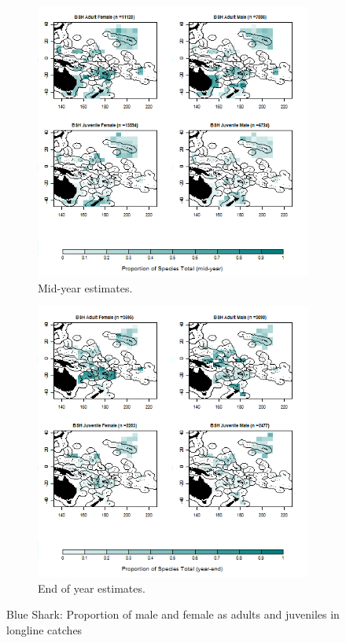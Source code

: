 \documentclass[12pt]{SCreport}
\begin{document}
\begin{landscape}
\begin{figure}
\centering
   \begin{subfigure}[b]{0.6\textwidth}
       \includegraphics[width=\textwidth]{../GRAPHICS/Map_maturity_sex_BSH_MY}
       \caption{Mid-year estimates.}
       \label{fig:test1}
   \end{subfigure}
   \begin{subfigure}[b]{0.6\textwidth}
       \includegraphics[width=\textwidth]{../GRAPHICS/Map_maturity_sex_BSH}
       \caption{End of year estimates.}
       \label{fig:test2}
   \end{subfigure}
\caption{Blue Shark: Proportion of male and female as adults and juveniles in longline catches }
\label{fig:test} 
\end{figure}
\end{landscape}
\end{document}
